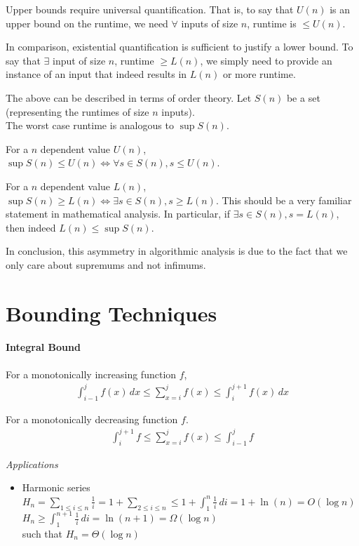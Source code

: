 \documentclass{article}
\begin{document}
Upper bounds require universal quantification. That is, to say that $U(n)$ is an upper bound on the runtime, we need $\forall$ inputs of size $n$, runtime is $\leq U(n)$.

In comparison, existential quantification is sufficient to justify a lower bound. To say that $\exists$ input of size $n$, runtime $\geq L(n)$, we simply need to provide an instance of an input that indeed results in $L(n)$ or more runtime.

The above can be described in terms of order theory. Let $S(n)$ be a set (representing the runtimes of size $n$ inputs).\\
The worst case runtime is analogous to $\sup S(n)$.

For a $n$ dependent value $U(n)$, $\sup S(n)\leq U(n) \iff \forall s\in S(n), s\leq U(n)$.

For a $n$ dependent value $L(n)$, $\sup S(n)\geq L(n) \iff \exists s\in S(n), s\geq L(n)$. This should be a very familiar statement in mathematical analysis. In particular, if $\exists s\in S(n), s=L(n)$, then indeed $L(n)\leq \sup S(n)$.

In conclusion, this asymmetry in algorithmic analysis is due to the fact that we only care about supremums and not infimums.

\section{Bounding Techniques}
\paragraph{Integral Bound}
For a monotonically increasing function $f$,
\begin{align*}
	\int_{i-1}^j f(x)\,dx \leq \sum_{x=i}^jf(x)\leq \int_i^{j+1}f(x)\,dx
\end{align*}

For a monotonically decreasing function $f$.
\begin{align*}
	\int_{i}^{j+1}f \leq \sum_{x=i}^jf(x) \leq \int_{i-1}^jf 
\end{align*}

\textit{Applications}
\begin{itemize}
	\item Harmonic series \\
	$H_n=\sum_{1\leq i\leq n}\frac{1}{i} = 1 + \sum_{2\leq i\leq n}\leq 1 + \int_1^{n}\frac{1}{i}\,di=1+\ln(n)=O(\log n)$\\
	$H_n\geq \int_1^{n+1}\frac{1}{i}\,di=\ln(n+1)=\Omega(\log n)$\\
	such that $H_n=\Theta(\log n)$
\end{itemize}
\end{document}
